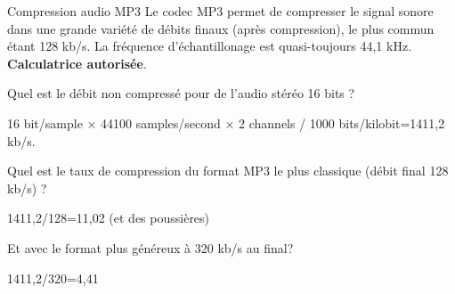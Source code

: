 \begin{exercice}
  \begin{exercicelet}{Compression audio MP3}
    Le codec MP3 permet de compresser le signal sonore dans une grande variété
    de débits finaux (après compression), le plus commun étant 128 kb/s. La
    fréquence d'échantillonage est quasi-toujours 44,1
    kHz. \textbf{Calculatrice autorisée}.
    \begin{questions}
    \item Quel est le débit non compressé pour de l'audio stéréo 16 bits ?
      \begin{correction}
        16 bit/sample × 44100 samples/second × 2 channels / 1000
        bits/kilobit=1411,2 kb/s.
      \end{correction}
    \item Quel est le taux de compression du format MP3 le plus classique
      (débit final 128 kb/s) ?
      \begin{correction}
        1411,2/128=11,02 (et des poussières)
      \end{correction}
    \item Et avec le format plus généreux à 320 kb/s au final?
      \begin{correction}
        1411,2/320=4,41
      \end{correction}
    \end{questions}
  \end{exercicelet}
\end{exercice}
